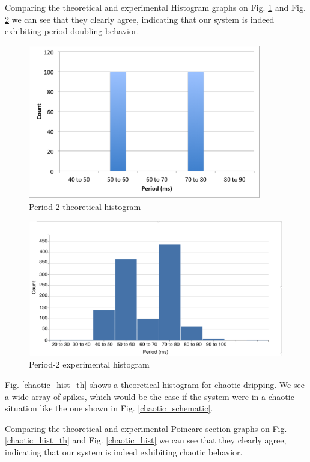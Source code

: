 \documentclass[11pt]{article}
\begin{document}
Comparing the theoretical and experimental Histogram graphs on Fig. \ref{period_doubling_hist_th} and Fig. \ref{period_doubling_hist} we can see that they clearly agree, indicating that our system is indeed exhibiting period doubling behavior.

\begin{figure}[htp]
\begin{center}
\includegraphics[width=4in]{figs/double_hist_th}
\caption{ Period-2 theoretical histogram}
\label{period_doubling_hist_th}
\end{center}
\end{figure}
\begin{figure}[htp]
\begin{center}
\includegraphics[width=4.4in]{figs/double_hist}
\caption{ Period-2 experimental histogram}
\label{period_doubling_hist}
\end{center}
\end{figure}

\newpage
Fig. \ref{chaotic_hist_th} shows a theoretical histogram for chaotic dripping. We see a wide array of spikes, which would be the case if the system were in a chaotic situation like the one shown in Fig. \ref{chaotic_schematic}.

Comparing the theoretical and experimental Poincare section graphs on Fig. \ref{chaotic_hist_th} and Fig. \ref{chaotic_hist} we can see that they clearly agree, indicating that our system is indeed exhibiting chaotic behavior.
\end{document}
